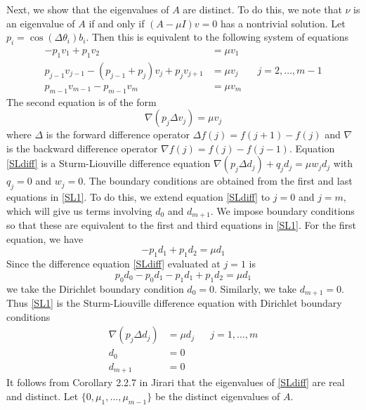 \documentclass[12pt]{article}
\begin{document}
Next, we show that the eigenvalues of $A$ are distinct. To do this, we note that $\nu$ is an eigenvalue of $A$ if and only if $(A - \mu I)v = 0$ has a nontrivial solution. Let $p_i = \cos(\Delta\theta_i) b_i$. Then this is equivalent to the following system of equations
\begin{equation}\label{SL1}
\begin{aligned}
-p_1 v_1 + p_1 v_2 &= \mu v_1 \\
p_{j-1} v_{j-1} - (p_{j-1} + p_j)v_j + p_j v_{j+1} &= \mu v_j && j = 2, \dots, m-1 \\
p_{m-1} v_{m-1} - p_{m-1}v_m &= \mu v_m
\end{aligned}
\end{equation}
The second equation is of the form
\begin{equation}\label{SLdiff}
\nabla( p_j \Delta v_j ) = \mu v_j
\end{equation}
where $\Delta$ is the forward difference operator $\Delta f(j) = f(j+1) - f(j)$ and $\nabla$ is the backward difference operator $\nabla f(j) = f(j) - f(j-1)$. Equation \eqref{SLdiff} is a Sturm-Liouville difference equation $\nabla( p_j \Delta d_j ) + q_j d_j = \mu w_j d_j$ with $q_j = 0$ and $w_j = 0$. The boundary conditions are obtained from the first and last equations in \eqref{SL1}. To do this, we extend equation \eqref{SLdiff} to $j = 0$ and $j = m$, which will give us terms involving $d_0$ and $d_{m+1}$. We impose boundary conditions so that these are equivalent to the first and third equations in \eqref{SL1}. For the first equation, we have
\[
-p_1 d_1 + p_1 d_2 = \mu d_1
\]
Since the difference equation \eqref{SLdiff} evaluated at $j = 1$ is
\[
p_0 d_0 - p_0 d_1 - p_1 d_1 + p_1 d_2 = \mu d_1
\]
we take the Dirichlet boundary condition $d_0 = 0$. Similarly, we take $d_{m+1} = 0$. Thus \eqref{SL1} is the Sturm-Liouville difference equation with Dirichlet boundary conditions
\begin{equation}\label{SLdiff2}
\begin{aligned}
\nabla( p_j \Delta d_j ) &= \mu d_j && j = 1, \dots, m \\
d_0 &= 0 \\
d_{m+1} &= 0
\end{aligned}
\end{equation}
It follows from Corollary 2.2.7 in Jirari that the eigenvalues of \eqref{SLdiff} are real and distinct. Let $\{0, \mu_1, \dots, \mu_{m-1}\}$ be the distinct eigenvalues of $A$.
\end{document}
